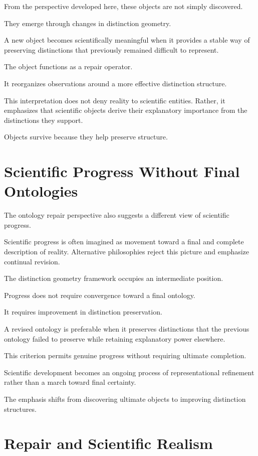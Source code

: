 \documentclass[11pt,oneside,openany]{book}
\begin{document}
From the perspective developed here, these objects are not simply discovered.

They emerge through changes in distinction geometry.

A new object becomes scientifically meaningful when it provides a stable way of preserving distinctions that previously remained difficult to represent.

The object functions as a repair operator.

It reorganizes observations around a more effective distinction structure.

This interpretation does not deny reality to scientific entities. Rather, it emphasizes that scientific objects derive their explanatory importance from the distinctions they support.

Objects survive because they help preserve structure.

\section{Scientific Progress Without Final Ontologies}

The ontology repair perspective also suggests a different view of scientific progress.

Scientific progress is often imagined as movement toward a final and complete description of reality. Alternative philosophies reject this picture and emphasize continual revision.

The distinction geometry framework occupies an intermediate position.

Progress does not require convergence toward a final ontology.

It requires improvement in distinction preservation.

A revised ontology is preferable when it preserves distinctions that the previous ontology failed to preserve while retaining explanatory power elsewhere.

This criterion permits genuine progress without requiring ultimate completion.

Scientific development becomes an ongoing process of representational refinement rather than a march toward final certainty.

The emphasis shifts from discovering ultimate objects to improving distinction structures.

\section{Repair and Scientific Realism}
\end{document}
